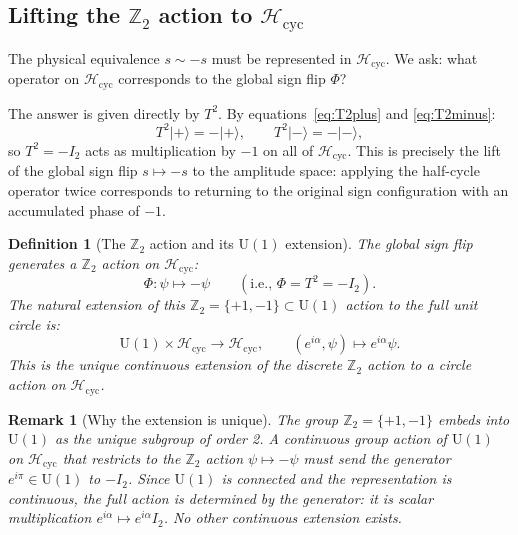 \documentclass[12pt,a4paper]{article}
\newtheorem{definition}[theorem]{Definition}
\newtheorem{remark}[theorem]{Remark}
\newcommand{\cplu}{|{+}\rangle}
\newcommand{\cmin}{|{-}\rangle}
\newcommand{\Hcycl}{\mathcal{H}_{\mathrm{cyc}}}
\begin{document}
\subsection{Lifting the \texorpdfstring{$\mathbb{Z}_2$}{Z2} action to \texorpdfstring{$\Hcycl$}{Hcyc}}

The physical equivalence $s \sim -s$ must be represented in $\Hcycl$. We ask: what
operator on $\Hcycl$ corresponds to the global sign flip $\Phi$?

The answer is given directly by $T^2$. By equations~\eqref{eq:T2plus} and
\eqref{eq:T2minus}:
\begin{equation}
T^2\cplu = -\cplu, \qquad T^2\cmin = -\cmin,
\label{eq:T2action}
\end{equation}
so $T^2 = -I_2$ acts as multiplication by $-1$ on all of $\Hcycl$. This is precisely
the lift of the global sign flip $s \mapsto -s$ to the amplitude space: applying
the half-cycle operator twice corresponds to returning to the original sign
configuration with an accumulated phase of $-1$.

\begin{definition}[The $\mathbb{Z}_2$ action and its $\mathrm{U}(1)$ extension]
\label{def:Z2_U1}
The global sign flip generates a $\mathbb{Z}_2$ action on $\Hcycl$:
\begin{equation}
\Phi : \psi \mapsto -\psi \qquad (\text{i.e., } \Phi = T^2 = -I_2).
\label{eq:Z2action}
\end{equation}
The \emph{natural extension} of this $\mathbb{Z}_2 = \{+1,-1\} \subset \mathrm{U}(1)$
action to the full unit circle is:
\begin{equation}
\mathrm{U}(1) \times \Hcycl \to \Hcycl, \qquad (e^{i\alpha}, \psi) \mapsto e^{i\alpha}\psi.
\label{eq:U1action}
\end{equation}
This is the unique continuous extension of the discrete $\mathbb{Z}_2$ action to a
circle action on $\Hcycl$.
\end{definition}

\begin{remark}[Why the extension is unique]
The group $\mathbb{Z}_2 = \{+1,-1\}$ embeds into $\mathrm{U}(1)$ as the unique
subgroup of order 2. A continuous group action of $\mathrm{U}(1)$ on $\Hcycl$ that
restricts to the $\mathbb{Z}_2$ action $\psi \mapsto -\psi$ must send the generator
$e^{i\pi} \in \mathrm{U}(1)$ to $-I_2$. Since $\mathrm{U}(1)$ is connected and the
representation is continuous, the full action is determined by the generator: it is
scalar multiplication $e^{i\alpha} \mapsto e^{i\alpha} I_2$. No other continuous
extension exists.
\end{remark}
\end{document}
